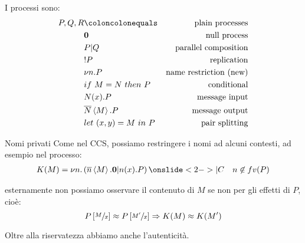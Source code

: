 \documentclass{beamer}
\theoremstyle{plain}
\theoremstyle{definition}
\theoremstyle{remark}
\newcommand{\obar}[1]{\overline{#1}}
\newcommand{\pa}[1]{\left(#1\right)}
\newcommand{\ang}[1]{\left<#1\right>}
\newcommand{\bra}[1]{\left[#1\right]}
\begin{document}
\begin{frame}
  I processi sono:
  \begin{align*}
    P,Q,R & \coloncolonequals & \text{plain processes} \\
          & \mathbf{0} & \text{null process} \\
          & P | Q & \text{parallel composition} \\
          & !P & \text{replication} \\
          & \nu n.P & \text{name restriction (new)} \\
          & if\ M=N\ then\ P & \text{conditional} \\
          & N(x).P & \text{message input} \\
          & \obar{N}\left< M\right> .P & \text{message output} \\
          & let\ (x,y) = M\ in\ P & \text{pair splitting}
  \end{align*}
\end{frame}

\begin{frame}{Nomi privati}
  Come nel CCS, possiamo restringere i nomi ad alcuni contesti, ad
  esempio nel processo:
  \begin{align*}
  K(M) = \nu n. \pa{ \obar{n}\ang{M}.\mathbf{0} | n(x).P }
    \onslide<2->{ |C }& &  n\not\in
    fv(P)
  \end{align*}

  esternamente non possiamo osservare il contenuto di $M$ se non per
  gli effetti di $P$, cioè:
  \[ P\bra{\sfrac{M}{x}} \approx P\bra{\sfrac{M'}{x}} \Rightarrow K(M)
    \approx K(M') \]
  
  Oltre alla riservatezza abbiamo anche l'autenticit\`a.
\end{frame}
\end{document}

